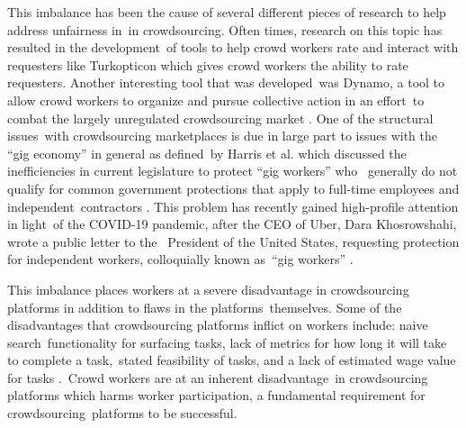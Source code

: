 \documentclass[letterpaper,12pt]{article}
\begin{document}
This imbalance has been the cause of several different pieces of research to help address unfairness in\
in crowdsourcing. Often times, research on this topic has resulted in the development\
of tools to help crowd workers rate and interact with requesters like Turkopticon \cite{irani2013turkopticon}
which gives crowd workers the ability to rate requesters. Another interesting tool that was developed\
was Dynamo, a tool to allow crowd workers to organize and pursue collective action in an effort\
to combat the largely unregulated crowdsourcing market \cite{salehi2015we}. One of the structural issues\
with crowdsourcing marketplaces is due in large part to issues with the ``gig economy'' in general as defined\
by Harris et al. which discussed the inefficiencies in current legislature to protect ``gig workers'' who \
generally do not qualify for common government protections that apply to full-time employees and independent\
contractors \cite{harris2015proposal}. This problem has recently gained high-profile attention in light\
of the COVID-19 pandemic, after the CEO of Uber, Dara Khosrowshahi, wrote a public letter to the \
President of the United States, requesting protection for independent workers, colloquially known as\
``gig workers'' \cite{kohsrowshahi_2020}.

This imbalance places workers at a severe disadvantage in crowdsourcing platforms in addition to flaws in the platforms\
themselves. Some of the disadvantages that crowdsourcing platforms inflict on workers include: naive search\
functionality for surfacing tasks, lack of metrics for how long it will take to complete a task,\
stated feasibility of tasks, and a lack of estimated wage value for tasks \cite{Kaplan2018}.\
Crowd workers are at an inherent disadvantage\
in crowdsourcing platforms which harms worker participation, a fundamental requirement for crowdsourcing\
platforms to be successful.
\end{document}
